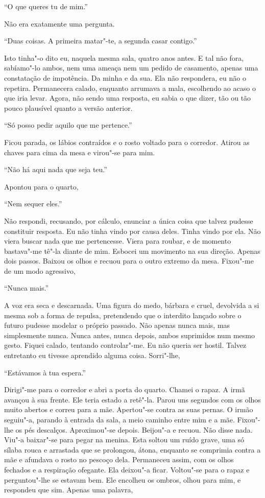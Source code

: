 ``O que queres tu de mim.''

Não era exatamente uma pergunta.

``Duas coisas. A primeira matar"-te, a segunda casar contigo.''

Isto tinha"-o dito eu, naquela mesma sala, quatro anos antes. E tal não
fora, sabíamo"-lo ambos, nem uma ameaça nem um pedido de casamento,
apenas uma constatação de impotência. Da minha e da sua. Ela não
respondera, eu não o repetira. Permanecera calado, enquanto arrumava a
mala, escolhendo ao acaso o que iria levar. Agora, não sendo uma
resposta, eu sabia o que dizer, tão ou tão pouco plausível quanto a
versão anterior.

``Só posso pedir aquilo que me pertence.''

Ficou parada, os lábios contraídos e o rosto voltado para o corredor.
Atirou as chaves para cima da mesa e virou"-se para mim.

``Não há aqui nada que seja teu.''

Apontou para o quarto,

``Nem sequer eles.''

Não respondi, recusando, por cálculo, enunciar a única coisa que talvez
pudesse constituir resposta. Eu não tinha vindo por causa deles. Tinha
vindo por ela. Não viera buscar nada que me pertencesse. Viera para
roubar, e de momento bastava"-me tê"-la diante de mim. Esbocei um
movimento na sua direção. Apenas dois passos. Baixou os olhos e recuou
para o outro extremo da mesa. Fixou"-me de um modo agressivo,

``Nunca mais.''

A voz era seca e descarnada. Uma figura do medo, bárbara e cruel,
devolvida a si mesma sob a forma de repulsa, pretendendo que o interdito
lançado sobre o futuro pudesse modelar o próprio passado. Não apenas
nunca mais, mas simplesmente nunca. Nunca antes, nunca depois, ambos
suprimidos num mesmo gesto. Fiquei calado, tentando controlar"-me. Eu
não queria ser hostil. Talvez entretanto eu tivesse aprendido alguma
coisa. Sorri"-lhe,

``Estávamos à tua espera.''

Dirigi"-me para o corredor e abri a porta do quarto. Chamei o rapaz. A
irmã avançou à sua frente. Ele teria estado a retê"-la. Parou uns
segundos com os olhos muito abertos e correu para a mãe. Apertou"-se
contra as suas pernas. O irmão seguiu"-a, parando à entrada da sala, a
meio caminho entre mim e a mãe. Fixou"-lhe os pés descalços.
Aproximou"-se depois. Beijou"-a e recuou. Não disse nada. Viu"-a
baixar"-se para pegar na menina. Esta soltou um ruído grave, uma só
sílaba rouca e arrastada que se prolongou, átona, enquanto se comprimia
contra a mãe e afundava o rosto no pescoço dela. Permaneceu assim, com
os olhos fechados e a respiração ofegante. Ela deixou"-a ficar.
Voltou"-se para o rapaz e perguntou"-lhe se estavam bem. Ele encolheu os
ombros, olhou para mim, e respondeu que sim. Apenas uma palavra,

